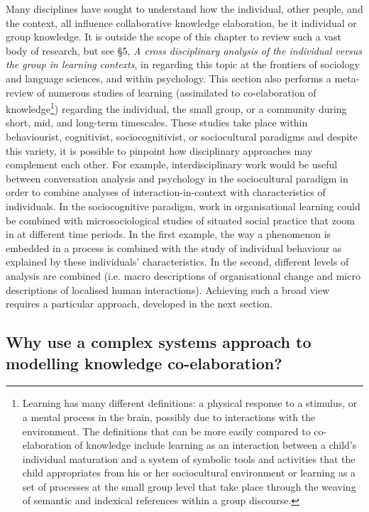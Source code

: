 \documentclass[output=paper]{langscibook}
\begin{document}
Many disciplines have sought to understand how the individual, other people, and the context, all influence collaborative knowledge elaboration, be it individual or group knowledge. It is outside the scope of this chapter to review such a vast body of research, but see §5, \textit{A cross disciplinary analysis of the individual versus the group in learning contexts}, in \citet{Lund2016} regarding this topic at the frontiers of sociology and language sciences, and within psychology. This section also performs a meta-review of numerous studies of learning (assimilated to co-elaboration of knowledge\footnote{Learning has many different definitions: a physical response to a stimulus, or a mental process in the brain, possibly due to interactions with the environment. The definitions that can be more easily compared to co-elaboration of knowledge include learning as an interaction between a child’s individual maturation and a system of symbolic tools and activities that the child appropriates from his or her sociocultural environment or learning as a set of processes at the small group level that take place through the weaving of semantic and indexical references within a group discourse.}) regarding the individual, the small group, or a community during short, mid, and long-term timescales. These studies take place within behaviourist, cognitivist, sociocognitivist, or sociocultural paradigms and despite this variety, it is possible to pinpoint how disciplinary approaches may complement each other. For example, interdisciplinary work would be useful between conversation analysis and psychology in the sociocultural paradigm in order to combine analyses of interaction-in-context with characteristics of individuals. In the sociocognitive paradigm, work in organisational learning could be combined with microsociological studies of situated social practice that zoom in at different time periods. In the first example, the way a phenomenon is embedded in a process is combined with the study of individual behaviour as explained by these individuals’ characteristics. In the second, different levels of analysis are combined (i.e. macro descriptions of organisational change and micro descriptions of localised human interactions). Achieving such a broad view requires a particular approach, developed in the next section.

\subsection{Why use a complex systems approach to modelling knowledge co-elaboration?}
\end{document}
